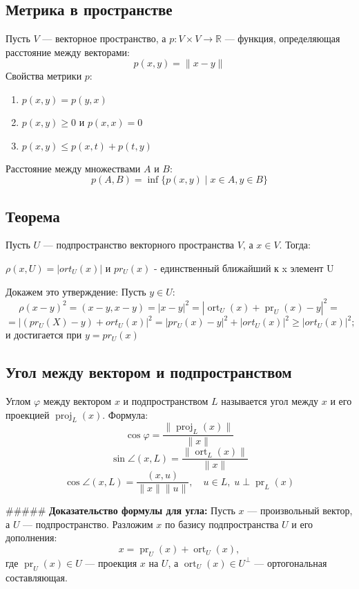 \documentclass[12pt]{article}
\begin{document}
\subsection*{Метрика в пространстве}
Пусть $V$ — векторное пространство, а $p: V \times V \to \mathbb{R}$ — функция, определяющая расстояние между векторами:
\[
p(x, y) = \|x - y\|
\]
Свойства метрики $p$:
\begin{enumerate}
    \item $p(x, y) = p(y, x)$
    \item $p(x, y) \geq 0$ и $p(x, x) = 0$
    \item $p(x, y) \leq p(x, t) + p(t, y)$
\end{enumerate}
Расстояние между множествами $A$ и $B$:
\[
p(A, B) = \inf \{ p(x, y) \mid x \in A, y \in B \}
\]

\subsection*{Теорема}

Пусть \( U \) — подпространство векторного пространства \( V \), а \( x \in V \). Тогда:

$\rho (x, U) = |ort_U(x)|$ и $pr_U(x)$ - единственный ближайший к x элемент U 

Докажем это утверждение:
Пусть $y \in U$:
\[
\rho (x - y)^2 = (x - y, x-y) = |x-y|^2 = |\operatorname{ort}_U(x) + \operatorname{pr}_U(x) - y|^2 = 
\]
\[
= |(pr_U(X) - y) + ort_U(x)|^2 = |pr_U(x) - y|^2 + |ort_U(x)|^2 \geq |ort_U(x)|^2; 
\]
и достигается при $y = pr_U(x)$

\subsection*{Угол между вектором и подпространством}
Углом $\varphi$ между вектором $x$ и подпространством $L$ называется угол между $x$ и его проекцией $\operatorname{proj}_L(x)$. Формула:
\[
\cos \varphi = \frac{\|\operatorname{proj}_L(x)\|}{\|x\|}
\]
\[
\sin \angle(x, L) = \frac{\|\operatorname{ort}_L(x)\|}{\|x\|}
\]
\[
\cos \angle(x, L) = \frac{(x, u)}{\|x\| \|u\|}, \quad u \in L, \; u \perp \operatorname{pr}_L(x)
\]

##### \textbf{Доказательство формулы для угла:}
Пусть $x$ — произвольный вектор, а $U$ — подпространство. Разложим $x$ по базису подпространства $U$ и его дополнения:
\[
x = \operatorname{pr}_U(x) + \operatorname{ort}_U(x),
\]
где $\operatorname{pr}_U(x) \in U$ — проекция $x$ на $U$, а $\operatorname{ort}_U(x) \in U^\perp$ — ортогональная составляющая.
\end{document}
